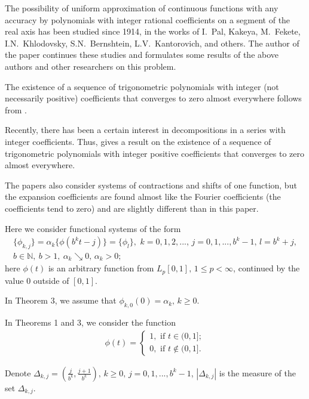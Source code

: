 \documentclass[
11pt,%
tightenlines,%
twoside,%
onecolumn,%
nofloats,%
nobibnotes,%
nofootinbib,%
superscriptaddress,%
noshowpacs,%
centertags]%
{revtex4}
\begin{document}
The  possibility of uniform approximation of continuous functions
with any accuracy by polynomials with integer rational
coefficients on a segment of the real axis has been studied since
1914, in the works of  I.~Pal, Kakeya, M.~Fekete, I.N.~Khlodovsky,
S.N.~Bernshtein, L.V.~Kantorovich, and others. The author of the
paper \cite{alp} continues these studies and formulates
some results of the above authors and other researchers on this
problem.

The  existence of a sequence of trigonometric polynomials with
integer (not necessarily positive) coefficients that converges to
zero almost everywhere follows from \cite {fek}.

Recently,  there has been a certain interest in decompositions in
a series with integer coefficients. Thus, \cite{kon} gives a
result on the existence of a sequence of trigonometric polynomials
with integer positive coefficients that converges to zero almost
everywhere.

The papers \cite{luk,kud} also consider systems of contractions
and shifts of one function, but the expansion coefficients are
found almost like the Fourier coefficients (the coefficients tend
to zero) and are slightly different than in this paper.

Here we consider functional systems of the form
\begin{eqnarray}
    \{\phi_{k,j}\}=\alpha_k\{\phi( b^kt-j)\}=\{\phi_{l}\},  \,\,
    k=0,1,2,..., \, j=0,1,...,b^k-1,\, l=b^k+j, \nonumber\\
    b\in \mathbb{N}, \  b>1,\ \alpha_k \searrow 0,\,\alpha_k>0;
\end{eqnarray}
here $ \phi (t) $ is an arbitrary function from $ L_p [0,1], \, 1
\le p <\infty $, continued by the value $ 0 $ outside of $[0,1]$.

In Theorem 3, we assume that $ \phi_{k, 0} (0) = \alpha_k,
\, k \ge 0 $.

In Theorems 1 and 3, we consider the function
\begin{eqnarray}
    \phi(t)=\left\{\begin{array}{rcl}
        1, \mbox { if }
        t\in (0,1]; \\
        0, \mbox{ if } t\notin (0,1].
    \end{array}
    \right.
\end{eqnarray}

Denote  $ \Delta_{k,j}=\left(\frac{j}{b^k},\frac{j+1}{b^k}
\right),\,k\ge 0, \, j=0,1,...,b^k-1$,
$\left\vert\Delta_{k,j}\right\vert$ is the measure of the set $
\Delta_{k, j}$.
\end{document}
